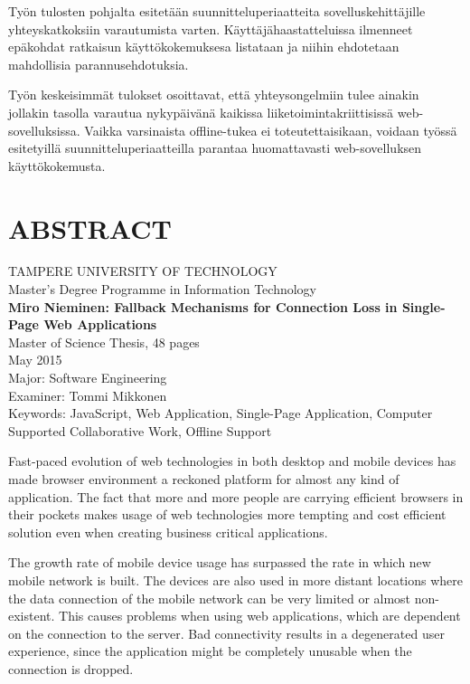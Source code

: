 Työn tulosten pohjalta esitetään suunnitteluperiaatteita sovelluskehittäjille yh\-te\-ys\-kat\-kok\-siin varautumista varten. Käyttäjähaastatteluissa ilmenneet epäkohdat ratkaisun käyttökokemuksesa listataan ja niihin ehdotetaan mahdollisia pa\-ran\-nus\-eh\-do\-tuk\-si\-a.

Työn keskeisimmät tulokset osoittavat, että yhteysongelmiin tulee ainakin jollakin tasolla varautua nykypäivänä kaikissa liiketoimintakriittisissä web-sovelluksissa. Vaikka varsinaista offline-tukea ei toteutettaisikaan, voidaan työssä esitetyillä suunnitteluperiaatteilla parantaa huomattavasti web-sovelluksen käyttökokemusta.






\newpage
\chapter*{ABSTRACT}
\begin{spacing}{1.0}
\textsf{TAMPERE UNIVERSITY OF TECHNOLOGY}\\
\textsf{Master's Degree Programme in Information Technology}\\
{\bf \textsf{Miro Nieminen: Fallback Mechanisms for Connection Loss in Single-Page Web Applications}}\\
\textsf{Master of Science Thesis, 48 pages}\\
\textsf{May 2015}\\
\textsf{Major: Software Engineering}\\
\textsf{Examiner: Tommi Mikkonen}\\
\textsf{Keywords: JavaScript, Web Application, Single-Page Application, Computer Supported Collaborative Work, Offline Support}\\
\end{spacing}
 
Fast-paced evolution of web technologies in both desktop and mobile devices has made browser environment a reckoned platform for almost any kind of application. The fact that more and more people are carrying efficient browsers in their pockets makes usage of web technologies more tempting and cost efficient solution even when creating business critical applications.

The growth rate of mobile device usage has surpassed the rate in which new mobile network is built. The devices are also used in more distant locations where the data connection of the mobile network can be very limited or almost non-existent. This causes problems when using web applications, which are dependent on the connection to the server. Bad connectivity results in a degenerated user experience, since the application might be completely unusable when the connection is dropped.

